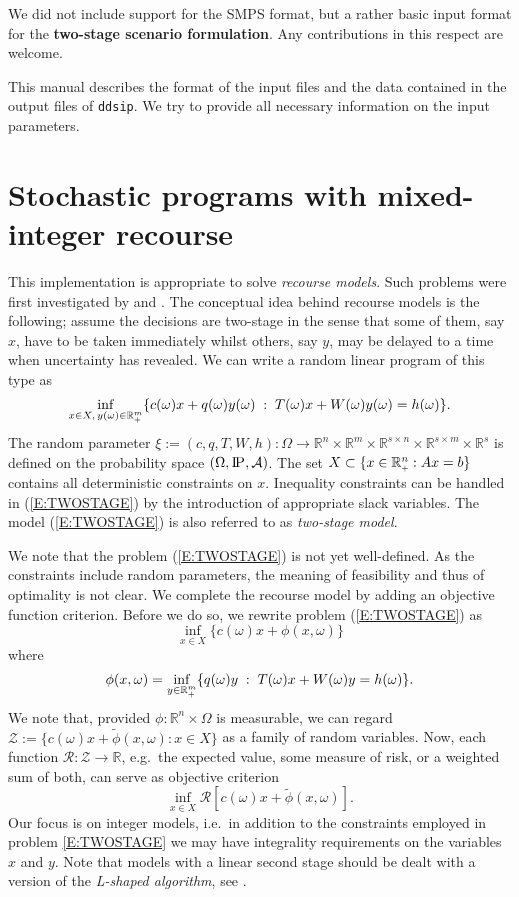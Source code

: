 \documentclass[11pt,draft]{article}
\newcommand{\risk}{{\mathcal{R}}} %
\newcommand{\RI}{{\risk}}
\newcommand{\+}{{\ti{+}}}
\newcommand{\1}{{\ti{1}}}
\newcommand{\R}{\mathbb{R}}
\newcommand{\ie}{i.e.\ }
\newcommand{\st}{\;:\;}
\newcommand{\tends}{\rightarrow}
\newcommand{\Rsn}{{\R^{s \times n}}}
\newcommand{\Rsm}{{\R^{s \times m}}}
\newcommand{\eg}{e.g.\ }
\renewcommand{\P}{{\textsc{I}\!\textsc{P}}}
\newcommand{\Prob}{{\P}}
\begin{document}
We did not include support for the SMPS format, but a rather basic input format for the {\bf two-stage scenario
formulation}.
Any contributions in this respect are welcome.

This manual describes the format of the input files and the data contained in the output
files of \texttt{ddsip}. We try to provide all necessary information on the input parameters.

\section{Stochastic programs with mixed-integer re\-course}
This implementation is appropriate to solve {\it recourse models}. Such problems
were first investigated by \cite{dant} and \cite{beal}. The conceptual idea behind recourse models is the
following; assume the decisions are two-stage in the sense that some of them, say $x$, have to
be taken immediately whilst others, say $y$, may be delayed to a time when uncertainty has revealed. We
can write a random linear program of this type as
%
\begin{equation} \label{E:TWOSTAGE}
\inf_{x \in X,\,y(\omega) \in \R^m_\+} \{c(\omega)x + q(\omega) y(\omega) \st T(\omega)x +
W(\omega)y(\omega) = h(\omega)\}.
\end{equation}
%
The random parameter $\xi:=(c,q,T,W,h):\Omega \tends \R^n \times \R^m \times \Rsn \times \Rsm
\times \R^s$ is defined on the probability space $(\Omega,\Prob,\mathcal{A})$. The set $X \subset
\{x \in \R_\+^n: Ax = b\}$ contains all deterministic constraints on $x$. Inequality constraints can
be handled in (\ref{E:TWOSTAGE}) by the introduction of appropriate slack variables. 
The model (\ref{E:TWOSTAGE}) is also referred to as {\it two-stage model}. 

We note that the problem (\ref{E:TWOSTAGE}) is not yet well-defined. As the constraints include
random parameters, the meaning of feasibility
and thus of optimality is not clear. We complete the recourse model by adding an objective function
criterion. Before we do so, we rewrite problem (\ref{E:TWOSTAGE}) as
%
\begin{equation} 
\inf_{x \in X} \{c(\omega)x + \phi(x,\omega)\}
\end{equation}
%
where
%
\begin{equation} 
\phi(x,\omega)=\inf_{y \in \R^m_\+} \{q(\omega) y \st T(\omega)x + W(\omega) y = h(\omega) \}.
\end{equation}
%
We note that, provided $\phi: \R^n \times \Omega$ is measurable, we can
regard $\mathcal{Z}:=\{c(\omega)x+ \tilde \phi(x,\omega) : x \in X\}$ as a family of random
variables. Now, each function $\RI: \mathcal{Z} \to \R$, \eg the expected value, some measure of
risk, or a weighted sum of both, can serve as objective criterion
%
\begin{equation} \label{E:TWOSTAGE-}
\inf_{x \in X} \RI[c(\omega)x + \tilde \phi(x,\omega)].
\end{equation}
%
Our focus is on integer models, \ie in addition to the constraints employed in problem
\eqref{E:TWOSTAGE} we may have integrality requirements on the variables $x$ and $y$.
Note that models with a linear second stage should be dealt with a version of the
{\it L-shaped algorithm}, see \cite{bir}.
\end{document}
